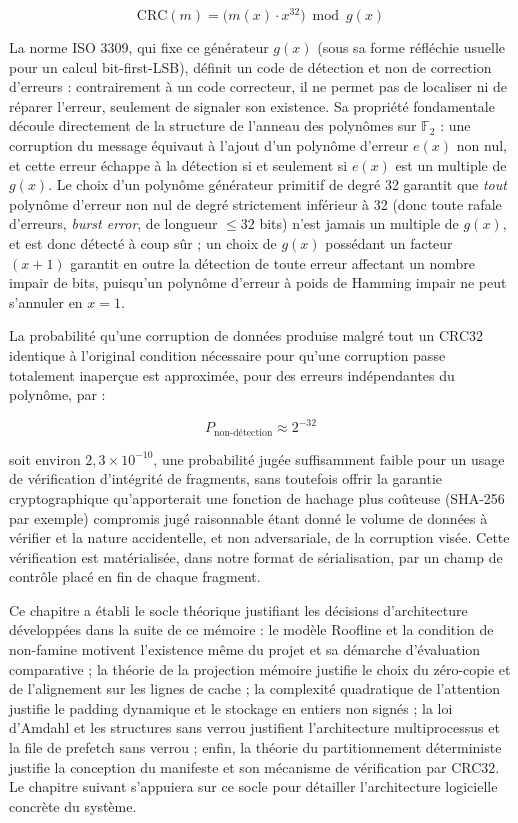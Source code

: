 \documentclass[12pt,a4paper]{report}
\begin{document}
\begin{equation}
\label{eq:crc_def}
\text{CRC}(m) = \bigl(m(x) \cdot x^{32}\bigr) \bmod g(x)
\end{equation}

La norme ISO 3309, qui fixe ce générateur $g(x)$ (sous sa forme réfléchie usuelle pour un calcul bit-first-LSB), définit un code de détection et non de correction d'erreurs : contrairement à un code correcteur, il ne permet pas de localiser ni de réparer l'erreur, seulement de signaler son existence. Sa propriété fondamentale découle directement de la structure de l'anneau des polynômes sur $\mathbb{F}_2$ : une corruption du message équivaut à l'ajout d'un polynôme d'erreur $e(x)$ non nul, et cette erreur échappe à la détection si et seulement si $e(x)$ est un multiple de $g(x)$. Le choix d'un polynôme générateur primitif de degré 32 garantit que \emph{tout} polynôme d'erreur non nul de degré strictement inférieur à 32 (donc toute rafale d'erreurs, \textit{burst error}, de longueur $\leq 32$ bits) n'est jamais un multiple de $g(x)$, et est donc détecté à coup sûr ; un choix de $g(x)$ possédant un facteur $(x+1)$ garantit en outre la détection de toute erreur affectant un nombre impair de bits, puisqu'un polynôme d'erreur à poids de Hamming impair ne peut s'annuler en $x=1$.

La probabilité qu'une corruption de données produise malgré tout un CRC32 identique à l'original condition nécessaire pour qu'une corruption passe totalement inaperçue est approximée, pour des erreurs indépendantes du polynôme, par :

\begin{equation}
\label{eq:crc_proba}
P_{\text{non-détection}} \approx 2^{-32}
\end{equation}

soit environ $2{,}3 \times 10^{-10}$, une probabilité jugée suffisamment faible pour un usage de vérification d'intégrité de fragments, sans toutefois offrir la garantie cryptographique qu'apporterait une fonction de hachage plus coûteuse (SHA-256 par exemple) compromis jugé raisonnable étant donné le volume de données à vérifier et la nature accidentelle, et non adversariale, de la corruption visée. Cette vérification est matérialisée, dans notre format de sérialisation, par un champ de contrôle placé en fin de chaque fragment.

\bigskip
\noindent Ce chapitre a établi le socle théorique justifiant les décisions d'architecture développées dans la suite de ce mémoire : le modèle Roofline et la condition de non-famine motivent l'existence même du projet et sa démarche d'évaluation comparative ; la théorie de la projection mémoire justifie le choix du zéro-copie et de l'alignement sur les lignes de cache ; la complexité quadratique de l'attention justifie le padding dynamique et le stockage en entiers non signés ; la loi d'Amdahl et les structures sans verrou justifient l'architecture multiprocessus et la file de prefetch sans verrou ; enfin, la théorie du partitionnement déterministe justifie la conception du manifeste et son mécanisme de vérification par CRC32. Le chapitre suivant s'appuiera sur ce socle pour détailler l'architecture logicielle concrète du système.
\end{document}
